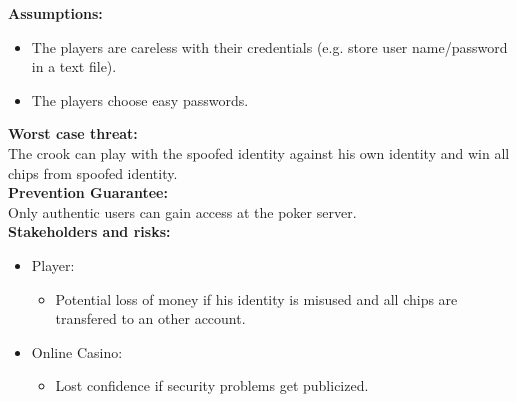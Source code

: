 \documentclass[a4paper,11pt]{report}
\begin{document}
\textbf{Assumptions:}
\begin{itemize}
\item The players are careless with their credentials (e.g. store user name/password in a text file).
\item The players choose easy passwords.
\end{itemize}
\textbf{Worst case threat:}\\
The crook can play with the spoofed identity against his own identity and win all chips from spoofed identity. \\
\textbf{Prevention Guarantee:} \\
Only authentic users can gain access at the poker server. \\
\textbf{Stakeholders and risks:}
\begin{itemize}
\item Player:
\begin{itemize}
\item Potential loss of money if his identity is misused and all chips are transfered to an other account.
\end{itemize}
\item Online Casino:
\begin{itemize}
\item Lost confidence if security problems get publicized.
\end{itemize}
\end{itemize}
\end{document}
